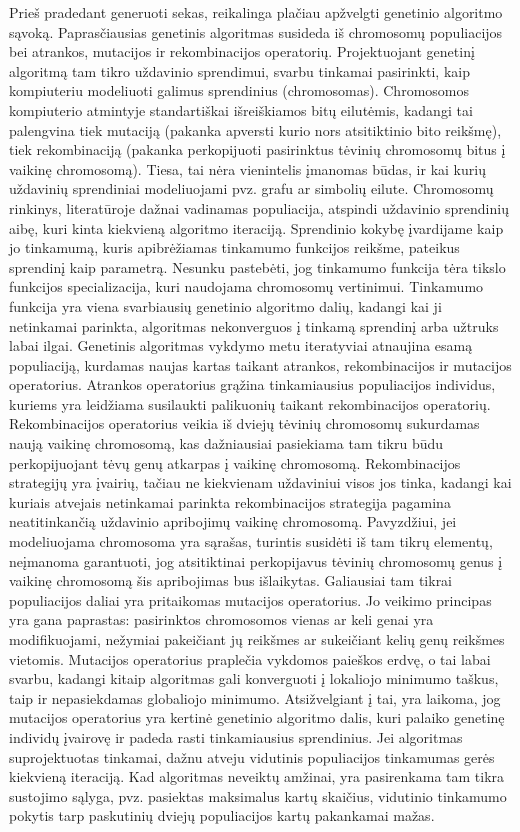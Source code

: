 \documentclass{VUMIFInfKursinis}
\begin{document}
Prieš pradedant generuoti sekas, reikalinga plačiau apžvelgti genetinio algoritmo sąvoką.
Paprasčiausias genetinis algoritmas susideda iš chromosomų populiacijos bei atrankos, mutacijos ir rekombinacijos operatorių.
Projektuojant genetinį algoritmą tam tikro uždavinio sprendimui, svarbu tinkamai pasirinkti,
kaip kompiuteriu modeliuoti galimus sprendinius (chromosomas).
Chromosomos kompiuterio atmintyje standartiškai išreiškiamos bitų eilutėmis,
kadangi tai palengvina tiek mutaciją (pakanka apversti kurio nors atsitiktinio bito reikšmę),
tiek rekombinaciją (pakanka perkopijuoti pasirinktus tėvinių chromosomų bitus į vaikinę chromosomą).
Tiesa, tai nėra vienintelis įmanomas būdas, ir kai kurių uždavinių sprendiniai modeliuojami pvz. grafu ar simbolių eilute.
Chromosomų rinkinys, literatūroje dažnai vadinamas populiacija, atspindi uždavinio sprendinių aibę, kuri kinta kiekvieną algoritmo iteraciją.
Sprendinio kokybę įvardijame kaip jo tinkamumą, kuris apibrėžiamas tinkamumo funkcijos reikšme, pateikus sprendinį kaip parametrą.
Nesunku pastebėti, jog tinkamumo funkcija tėra tikslo funkcijos specializacija, kuri naudojama chromosomų vertinimui.
Tinkamumo funkcija yra viena svarbiausių genetinio algoritmo dalių,
kadangi kai ji netinkamai parinkta, algoritmas nekonverguos į tinkamą sprendinį arba užtruks labai ilgai.  
Genetinis algoritmas vykdymo metu iteratyviai atnaujina esamą populiaciją, kurdamas naujas kartas taikant atrankos, rekombinacijos ir mutacijos operatorius.
Atrankos operatorius grąžina tinkamiausius populiacijos individus, kuriems yra leidžiama susilaukti palikuonių taikant rekombinacijos operatorių.
Rekombinacijos operatorius veikia iš dviejų tėvinių chromosomų sukurdamas naują vaikinę chromosomą, kas dažniausiai pasiekiama
tam tikru būdu perkopijuojant tėvų genų atkarpas į vaikinę chromosomą.
Rekombinacijos strategijų yra įvairių, tačiau ne kiekvienam uždaviniui visos jos tinka, kadangi
kai kuriais atvejais netinkamai parinkta rekombinacijos strategija pagamina neatitinkančią uždavinio apribojimų vaikinę chromosomą.
Pavyzdžiui, jei modeliuojama chromosoma yra sąrašas, turintis susidėti iš tam tikrų elementų, neįmanoma garantuoti, jog atsitiktinai
perkopijavus tėvinių chromosomų genus į vaikinę chromosomą šis apribojimas bus išlaikytas.
Galiausiai tam tikrai populiacijos daliai yra pritaikomas mutacijos operatorius.
Jo veikimo principas yra gana paprastas: pasirinktos chromosomos vienas ar keli genai yra modifikuojami,
nežymiai pakeičiant jų reikšmes ar sukeičiant kelių genų reikšmes vietomis.
Mutacijos operatorius praplečia vykdomos paieškos erdvę, o tai labai svarbu, kadangi kitaip algoritmas gali konverguoti
į lokaliojo minimumo taškus, taip ir nepasiekdamas globaliojo minimumo.
Atsižvelgiant į tai, yra laikoma, jog mutacijos operatorius yra kertinė genetinio algoritmo dalis,
kuri palaiko genetinę individų įvairovę ir padeda rasti tinkamiausius sprendinius.
Jei algoritmas suprojektuotas tinkamai, dažnu atveju vidutinis populiacijos tinkamumas gerės kiekvieną iteraciją.
Kad algoritmas neveiktų amžinai, yra pasirenkama tam tikra sustojimo sąlyga, pvz. pasiektas maksimalus
kartų skaičius, vidutinio tinkamumo pokytis tarp paskutinių dviejų populiacijos kartų pakankamai mažas.
\end{document}
